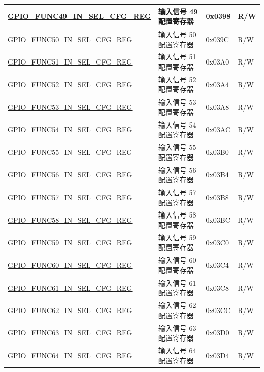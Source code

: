 \begin{longtable}{ | p{6cm} | p{7.2cm} | p{1.3cm} | p{1cm} | }
\hyperref[regdesc:GPIOFUNCRINSELCFGREG]{GPIO\_FUNC49\_IN\_SEL\_CFG\_REG} & 输入信号 49 配置寄存器 & 0x0398 & R/W \\ \hline
\hyperref[regdesc:GPIOFUNCRINSELCFGREG]{GPIO\_FUNC50\_IN\_SEL\_CFG\_REG} & 输入信号 50 配置寄存器 & 0x039C & R/W \\ \hline
\hyperref[regdesc:GPIOFUNCRINSELCFGREG]{GPIO\_FUNC51\_IN\_SEL\_CFG\_REG} & 输入信号 51 配置寄存器 & 0x03A0 & R/W \\ \hline
\hyperref[regdesc:GPIOFUNCRINSELCFGREG]{GPIO\_FUNC52\_IN\_SEL\_CFG\_REG} & 输入信号 52 配置寄存器 & 0x03A4 & R/W \\ \hline
\hyperref[regdesc:GPIOFUNCRINSELCFGREG]{GPIO\_FUNC53\_IN\_SEL\_CFG\_REG} & 输入信号 53 配置寄存器 & 0x03A8 & R/W \\ \hline
\hyperref[regdesc:GPIOFUNCRINSELCFGREG]{GPIO\_FUNC54\_IN\_SEL\_CFG\_REG} & 输入信号 54 配置寄存器 & 0x03AC & R/W \\ \hline
\hyperref[regdesc:GPIOFUNCRINSELCFGREG]{GPIO\_FUNC55\_IN\_SEL\_CFG\_REG} & 输入信号 55 配置寄存器 & 0x03B0 & R/W \\ \hline
\hyperref[regdesc:GPIOFUNCRINSELCFGREG]{GPIO\_FUNC56\_IN\_SEL\_CFG\_REG} & 输入信号 56 配置寄存器 & 0x03B4 & R/W \\ \hline
\hyperref[regdesc:GPIOFUNCRINSELCFGREG]{GPIO\_FUNC57\_IN\_SEL\_CFG\_REG} & 输入信号 57 配置寄存器 & 0x03B8 & R/W \\ \hline
\hyperref[regdesc:GPIOFUNCRINSELCFGREG]{GPIO\_FUNC58\_IN\_SEL\_CFG\_REG} & 输入信号 58 配置寄存器 & 0x03BC & R/W \\ \hline
\hyperref[regdesc:GPIOFUNCRINSELCFGREG]{GPIO\_FUNC59\_IN\_SEL\_CFG\_REG} & 输入信号 59 配置寄存器 & 0x03C0 & R/W \\ \hline
\hyperref[regdesc:GPIOFUNCRINSELCFGREG]{GPIO\_FUNC60\_IN\_SEL\_CFG\_REG} & 输入信号 60 配置寄存器 & 0x03C4 & R/W \\ \hline
\hyperref[regdesc:GPIOFUNCRINSELCFGREG]{GPIO\_FUNC61\_IN\_SEL\_CFG\_REG} & 输入信号 61 配置寄存器 & 0x03C8 & R/W \\ \hline
\hyperref[regdesc:GPIOFUNCRINSELCFGREG]{GPIO\_FUNC62\_IN\_SEL\_CFG\_REG} & 输入信号 62 配置寄存器 & 0x03CC & R/W \\ \hline
\hyperref[regdesc:GPIOFUNCRINSELCFGREG]{GPIO\_FUNC63\_IN\_SEL\_CFG\_REG} & 输入信号 63 配置寄存器 & 0x03D0 & R/W \\ \hline
\hyperref[regdesc:GPIOFUNCRINSELCFGREG]{GPIO\_FUNC64\_IN\_SEL\_CFG\_REG} & 输入信号 64 配置寄存器 & 0x03D4 & R/W \\ \hline

\end{longtable}
